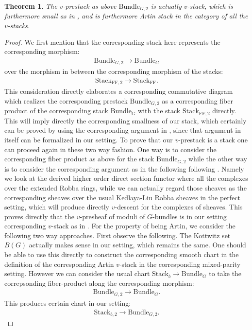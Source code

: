 \documentclass[12pt]{book}
\newtheorem{theorem}{Theorem}
\theoremstyle{definition}
\begin{document}
\begin{theorem}
The $v$-prestack as above $\mathrm{Bundle}_{G,2}$ is actually $v$-stack, which is furthermore small as in \cite{FS}, and is furthermore Artin stack in the category of all the $v$-stacks.
\end{theorem}

\begin{proof}
We first mention that the corresponding stack here represents the corresponding morphism:
\begin{align}
\mathrm{Bundle}_{G,2} \rightarrow \mathrm{Bundle}_{G}
\end{align}
over the morphism in between the corresponding morphism of the stacks:
\begin{align}
\mathrm{Stack}_{\mathrm{FF},2}\rightarrow \mathrm{Stack}_{\mathrm{FF}}.
\end{align}
This consideration directly elaborates a corresponding commutative diagram which realizes the corresponding prestack $\mathrm{Bundle}_{G,2}$ as a corresponding fiber product of the corresponding stack $\mathrm{Bundle}_{G}$ with the stack $\mathrm{Stack}_{\mathrm{FF},2}$ directly. This will imply directly the corresponding smallness of our stack, which certainly can be proved by using the corresponding argument in \cite[Proposition 1.3 in Chapter III]{FS}, since that argument in itself can be formalized in our setting. To prove that our $v$-prestack is a stack one can proceed again in these two way fashion. One way is to consider the corresponding fiber product as above for the stack $\mathrm{Bundle}_{G,2}$ while the other way is to consider the corresponding argument as in the following following \cite{FS}. Namely we look at the derived higher order direct section functor where all the complexes over the extended Robba rings, while we can actually regard those sheaves as the corresponding sheaves over the usual Kedlaya-Liu Robba sheaves in the perfect setting, which will produce directly $v$-descent for the complexes of sheaves. This proves directly that the $v$-presheaf of moduli of $G$-bundles is in our setting corresponding $v$-stack as in \cite{FS}. For the property of being Artin, we consider the following two way approaches. First observe the following. The Kottwitz set $B(G)$ actually makes sense in our setting, which remains the same. One should be able to use this directly to construct the corresponding smooth chart in the definition of the corresponding Artin $v$-stack in the corresponding mixed-parity setting. However we can consider the usual chart $\mathrm{Stack}_b\rightarrow \mathrm{Bundle}_{G}$ to take the correpsonding fiber-product along the corresponding morphism:
\begin{align}
\mathrm{Bundle}_{G,2} \rightarrow \mathrm{Bundle}_{G}.
\end{align}
This produces certain chart in our setting:
\begin{align}
\mathrm{Stack}_{b,2}\rightarrow \mathrm{Bundle}_{G,2}.
\end{align}
\end{proof}
\end{document}
